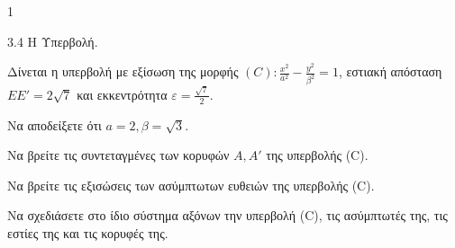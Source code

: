 \begin{ylh}{1}
    \item 3.4 Η Υπερβολή.
\end{ylh}
Δίνεται η υπερβολή με εξίσωση της μορφής $(C): \frac{x^2}{a^2} - \frac{y^2}{\beta^2}=1$, εστιακή απόσταση $EE'=2\sqrt{7}$ και εκκεντρότητα $\varepsilon=\frac{\sqrt{7}}{2}$.
\begin{alist}
\item Να αποδείξετε ότι $a=2, \beta=\sqrt{3}$. 
\item
    \begin{rlist}
    \item Να βρείτε τις συντεταγμένες των κορυφών $A, A'$ της υπερβολής (C).
    \item Να βρείτε τις εξισώσεις των ασύμπτωτων ευθειών της υπερβολής (C). 
    \end{rlist}
\item Να σχεδιάσετε στο ίδιο σύστημα αξόνων την υπερβολή (C), τις ασύμπτωτές της, τις εστίες της και τις κορυφές της. 
\end{alist}